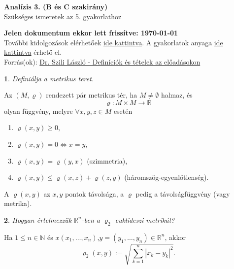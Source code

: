 \documentclass[a4paper]{article}
\def\R{\mathbb{R}}
\def\N{\mathbb{N}}
\theoremstyle{qstyle}
\newtheorem{question}{}{}
\begin{document}
	\begin{center}
		{\Large\textbf{Analízis 3. (B és C szakirány)}}\\
		{\Large Szükséges ismeretek az 5. gyakorlathoz}
	\end{center}
	
	\begin{framed}
		\textbf{Jelen dokumentum ekkor lett frissítve: {\yyyymmdddate\today} \ \currenttime}\\
		További kidolgozások elérhetőek \href{https://people.inf.elte.hu/totadavid95/Analizis3/2019-tavasz/}{ide kattintva}. A gyakorlatok anyaga \href{http://numanal.inf.elte.hu/~szili/Oktatas/An3_BC_szakirany_2019/An3_BC_gyak_2019_tavasz.pdf}{ide kattintva} érhető el.\\	
		Forrás(ok): \href{http://numanal.inf.elte.hu/~szili/Oktatas/An3_BC_szakirany_2019/An3_BC_ea_def_tetel_2019_tavasz.pdf}{Dr. Szili László - Definíciók és tételek az előadásokon}
	\end{framed}

	\begin{question}
		Definiálja a metrikus teret.  
	\end{question}
	Az $(M,\varrho)$ rendezett pár metrikus tér, ha $M\ne \emptyset$ halmaz, és
	$$\varrho: M \times M \to \R$$
	olyan függvény, melyre $\forall x,y,z\in M$ esetén
	\vspace{-4mm}
	\begin{enumerate}
		\item $\varrho(x,y)\ge 0$,
		\item $\varrho(x,y) = 0 \Longleftrightarrow x = y$,
		\item $\varrho(x,y) = \varrho(y,x)$ (szimmetria),
		\item $\varrho(x,y) \le \varrho(x,z) + \varrho(z,y)$ (háromszög-egyenlőtlenség).
	\end{enumerate}
	\vspace{-4mm}
	A $\varrho(x,y)$ az $x,y$ pontok távolsága, a $\varrho$ pedig a távolságfüggvény (vagy metrika).
	
	\begin{question}
		Hogyan értelmezzük $\R^n$-ben a $\varrho_2$ euklideszi metrikát?
	\end{question}
	Ha $1\le n \in \N$ és $x (x_1,\dots,x_n)$,$y=(y_1,\dots,y_n)\in \R^n$, akkor
	$$\varrho_2(x,y) := \sqrt{\sum_{k=1}^{n}|x_k -y_k|^2} \text{.}$$
\end{document}
